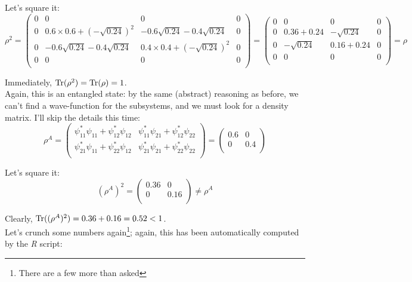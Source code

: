 \documentclass[solutions.tex]{subfiles}
\begin{document}
Let's square it:
\[
	\rho^2 = \begin{pmatrix}
		0 & 0            & 0            & 0 \\
		0 & 0.6\times0.6 + (-\sqrt{0.24})^2 &  -0.6\sqrt{0.24}-0.4\sqrt{0.24} & 0 \\
		0 & -0.6\sqrt{0.24}-0.4\sqrt{0.24} & 0.4\times0.4 + (-\sqrt{0.24})^2  & 0 \\
		0 & 0            & 0            & 0 \\
	\end{pmatrix} = \begin{pmatrix}
		0 & 0            & 0            & 0 \\
		0 & 0.36 + 0.24            & -\sqrt{0.24} & 0 \\
		0 & -\sqrt{0.24} & 0.16+0.24         & 0 \\
		0 & 0            & 0            & 0 \\
	\end{pmatrix} = \rho
\]

Immediately, $\text{Tr}(\rho^2) = \text{Tr}(\rho) = 1$. \\

Again, this is an entangled state: by the same (abstract) reasoning as
before, we can't find a wave-function for the subsystems, and we must
look for a density matrix. I'll skip the details this time:
\[
	\rho^A =  \begin{pmatrix}
		\psi_{11}^*\psi_{11} + \psi_{12}^*\psi_{12}
			& \psi_{11}^*\psi_{21} + \psi_{12}^*\psi_{22} \\
		\psi_{21}^*\psi_{11} + \psi_{22}^*\psi_{12}
			& \psi_{21}^*\psi_{21} + \psi_{22}^*\psi_{22} \\
	\end{pmatrix} = \begin{pmatrix}
		0.6 & 0 \\
		0 & 0.4 \\
	\end{pmatrix}
\]

Let's square it:
\[
	(\rho^A)^2 = \begin{pmatrix}
		0.36 & 0    \\
		0    & 0.16 \\
	\end{pmatrix} \neq \rho^A
\]

Clearly, $\text{Tr}((\rho^A)^2) = 0.36+0.16 = 0.52 < 1$. \\

Let's crunch some numbers again\footnote{There are a few more than
asked}; again, this has been automatically computed by the
\textit{R} script:
\end{document}
